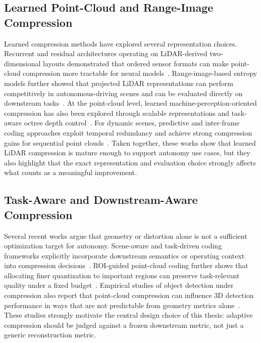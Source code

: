 \subsection{Learned Point-Cloud and Range-Image Compression}
Learned compression methods have explored several representation choices. Recurrent and residual architectures operating on LiDAR-derived two-dimensional layouts demonstrated that ordered sensor formats can make point-cloud compression more tractable for neural models~\cite{tu2019pointcloud}. Range-image-based entropy models further showed that projected LiDAR representations can perform competitively in autonomous-driving scenes and can be evaluated directly on downstream tasks~\cite{wang2022rangeentropy}. At the point-cloud level, learned machine-perception-oriented compression has also been explored through scalable representations and task-aware octree depth control~\cite{liu2024octreedepth}. For dynamic scenes, predictive and inter-frame coding approaches exploit temporal redundancy and achieve strong compression gains for sequential point clouds~\cite{fan2024umotion,sun2025lpcm,akhtar_inter-frame_2024}. Taken together, these works show that learned LiDAR compression is mature enough to support autonomy use cases, but they also highlight that the exact representation and evaluation choice strongly affects what counts as a meaningful improvement.

\subsection{Task-Aware and Downstream-Aware Compression}
Several recent works argue that geometry or distortion alone is not a sufficient optimization target for autonomy. Scene-aware and task-driven coding frameworks explicitly incorporate downstream semantics or operating context into compression decisions~\cite{sun2023salpcc}. ROI-guided point-cloud coding further shows that allocating finer quantization to important regions can preserve task-relevant quality under a fixed budget~\cite{xie2024roipcgc}. Empirical studies of object detection under compression also report that point-cloud compression can influence 3D detection performance in ways that are not predictable from geometry metrics alone~\cite{martins2024impact}. These studies strongly motivate the central design choice of this thesis: adaptive compression should be judged against a frozen downstream metric, not just a generic reconstruction metric.

